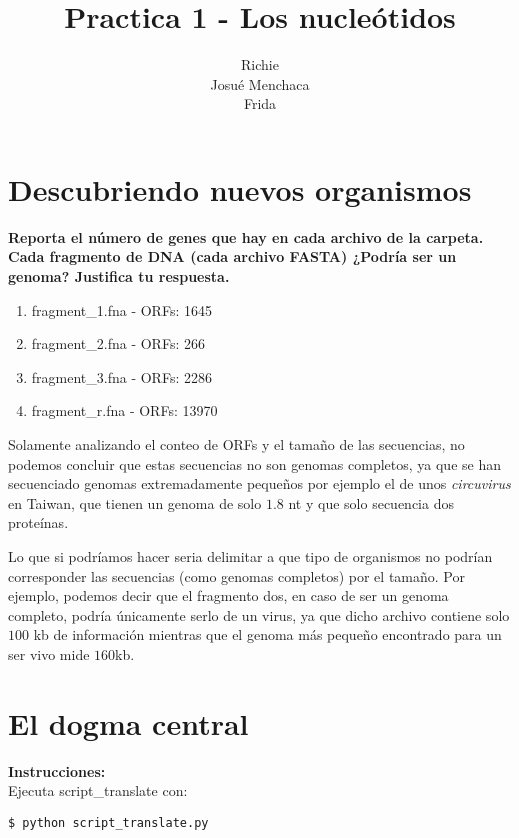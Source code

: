 \documentclass[letter]{article}
\title{Practica 1 - Los nucleótidos}
\author{ Richie \\
Josué Menchaca \\
Frida}
\begin{document}
\maketitle
    
    \section{Descubriendo nuevos organismos}

    \textbf{Reporta el número de genes que hay en cada archivo de la carpeta. Cada fragmento de DNA (cada archivo FASTA) ¿Podría ser un genoma? Justifica tu respuesta.}

    \begin{enumerate}
        \item fragment\_1.fna - ORFs: 1645

        \item fragment\_2.fna - ORFs: 266

        \item fragment\_3.fna - ORFs: 2286

        \item fragment\_r.fna - ORFs: 13970
    \end{enumerate}

    Solamente analizando el conteo de ORFs y el tamaño de las secuencias, no podemos concluir que estas secuencias no son genomas completos, ya que se han secuenciado genomas extremadamente pequeños por ejemplo el de unos \textit{circuvirus} en Taiwan, que tienen un genoma de solo $1.8$ nt y que solo secuencia dos proteínas. \cite{genome-virus}

    Lo que si podríamos hacer seria delimitar a que tipo de organismos no podrían corresponder las secuencias (como genomas completos) por el tamaño.
    Por ejemplo, podemos decir que el fragmento dos, en caso de ser un genoma completo, podría únicamente serlo de un virus, ya que dicho archivo contiene solo $100$ kb de información mientras que el genoma más pequeño encontrado para un ser vivo mide $160$kb. \cite{smallest-bacterial-genome}

    \section{El dogma central}

    \textbf{Instrucciones:} \\
    Ejecuta script\_translate con:

    \begin{lstlisting}
$ python script_translate.py
\end{lstlisting}
\end{document}
